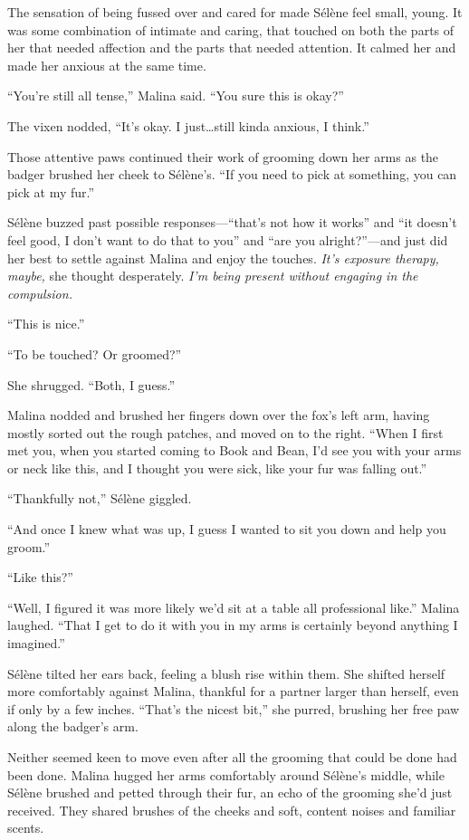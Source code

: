 The sensation of being fussed over and cared for made Sélène feel small, young. It was some combination of intimate and caring, that touched on both the parts of her that needed affection and the parts that needed attention. It calmed her and made her anxious at the same time.

``You're still all tense,'' Malina said. ``You sure this is okay?''

The vixen nodded, ``It's okay. I just\ldots{}still kinda anxious, I think.''

Those attentive paws continued their work of grooming down her arms as the badger brushed her cheek to Sélène's. ``If you need to pick at something, you can pick at my fur.''

Sélène buzzed past possible responses---``that's not how it works'' and ``it doesn't feel good, I don't want to do that to you'' and ``are you alright?''---and just did her best to settle against Malina and enjoy the touches. \emph{It's exposure therapy, maybe,} she thought desperately. \emph{I'm being present without engaging in the compulsion.}

``This is nice.''

``To be touched? Or groomed?''

She shrugged. ``Both, I guess.''

Malina nodded and brushed her fingers down over the fox's left arm, having mostly sorted out the rough patches, and moved on to the right. ``When I first met you, when you started coming to Book and Bean, I'd see you with your arms or neck like this, and I thought you were sick, like your fur was falling out.''

``Thankfully not,'' Sélène giggled.

``And once I knew what was up, I guess I wanted to sit you down and help you groom.''

``Like this?''

``Well, I figured it was more likely we'd sit at a table all professional like.'' Malina laughed. ``That I get to do it with you in my arms is certainly beyond anything I imagined.''

Sélène tilted her ears back, feeling a blush rise within them. She shifted herself more comfortably against Malina, thankful for a partner larger than herself, even if only by a few inches. ``That's the nicest bit,'' she purred, brushing her free paw along the badger's arm.

Neither seemed keen to move even after all the grooming that could be done had been done. Malina hugged her arms comfortably around Sélène's middle, while Sélène brushed and petted through their fur, an echo of the grooming she'd just received. They shared brushes of the cheeks and soft, content noises and familiar scents.

